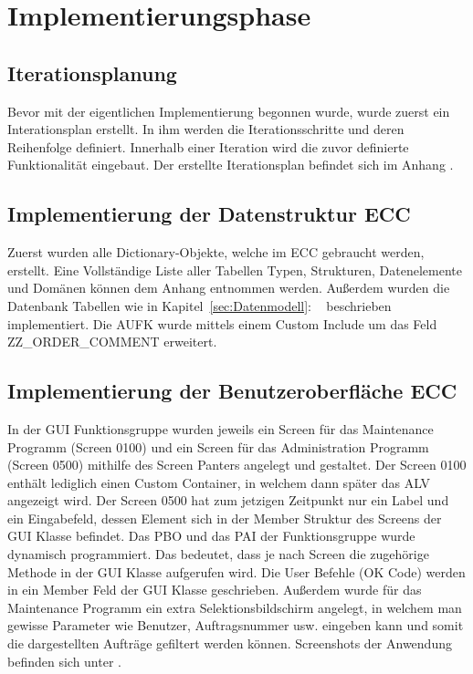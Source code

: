 \section{Implementierungsphase} 
\label{sec:Implementierungsphase}

\subsection{Iterationsplanung}
\label{sec:Iterationsplanung}
Bevor mit der eigentlichen Implementierung begonnen wurde, wurde zuerst ein Interationsplan erstellt. In ihm werden die Iterationsschritte und deren Reihenfolge definiert. Innerhalb einer Iteration wird die zuvor definierte Funktionalität eingebaut. Der erstellte Iterationsplan befindet sich im Anhang .

\subsection{Implementierung der Datenstruktur ECC}
\label{sec:Implementierung der Datenstruktur ECC}
Zuerst wurden alle Dictionary-Objekte, welche im \ac{ECC} gebraucht werden, erstellt. Eine Vollständige Liste aller Tabellen Typen, Strukturen, Datenelemente und Domänen können dem Anhang entnommen werden. Außerdem wurden die Datenbank Tabellen wie in Kapitel~\ref{sec:Datenmodell}: ~ beschrieben implementiert. Die AUFK wurde mittels einem Custom Include um das Feld ZZ\_ORDER\_COMMENT erweitert.

\subsection{Implementierung der Benutzeroberfläche ECC}
\label{sec:Implementierung der Benutzeroberfläche ECC}
In der \ac{GUI} Funktionsgruppe wurden jeweils ein Screen für das Maintenance Programm (Screen 0100) und ein Screen für das Administration Programm (Screen 0500) mithilfe des Screen Panters angelegt und gestaltet. Der Screen 0100 enthält lediglich einen Custom Container, in welchem dann später das \ac{ALV} angezeigt wird. Der Screen 0500 hat zum jetzigen Zeitpunkt nur ein Label und ein Eingabefeld, dessen Element sich in der Member Struktur des Screens der \ac{GUI} Klasse befindet. Das \ac{PBO} und das \ac{PAI} der Funktionsgruppe wurde dynamisch programmiert. Das bedeutet, dass je nach Screen die zugehörige Methode in der \ac{GUI} Klasse aufgerufen wird. Die User Befehle (OK Code) werden in ein Member Feld der \ac{GUI} Klasse geschrieben. Außerdem wurde für das Maintenance Programm ein extra Selektionsbildschirm angelegt, in welchem man gewisse Parameter wie Benutzer, Auftragsnummer usw. eingeben kann und somit die dargestellten Aufträge gefiltert werden können. Screenshots der Anwendung befinden sich unter .

